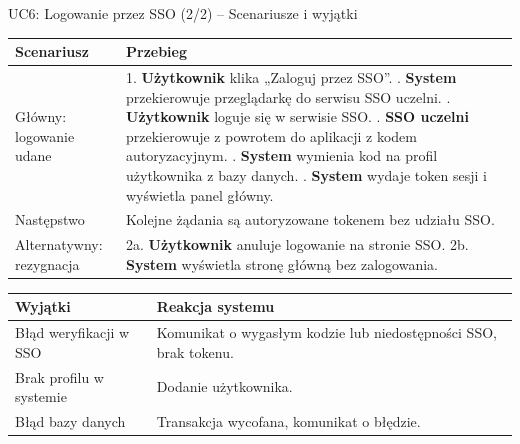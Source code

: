 \documentclass[aspectratio=169, 10pt, xcolor=table]{beamer}
\renewcommand{\arraystretch}{1.18}
\begin{document}
\begin{frame}{UC6: Logowanie przez SSO (2/2) -- Scenariusze i wyjątki}
    \scriptsize
    \renewcommand{\arraystretch}{1.10}
    \begin{tabularx}{\textwidth}{|U{3.5cm}|Y|}
        \hline
        \textcolor{NavyPrimary}{\textbf{Scenariusz}} & \textcolor{NavyPrimary}{\textbf{Przebieg}} \\
        \hline
        Główny: logowanie udane &
        1. \textbf{Użytkownik} klika „Zaloguj przez SSO”. . \textbf{System} przekierowuje przeglądarkę do serwisu SSO uczelni. . \textbf{Użytkownik} loguje się w serwisie SSO. . \textbf{SSO uczelni} przekierowuje z powrotem do aplikacji z kodem autoryzacyjnym. . \textbf{System} wymienia kod na profil użytkownika z bazy danych. . \textbf{System} wydaje token sesji i wyświetla panel główny. \\
        \hline
        Następstwo & Kolejne żądania są autoryzowane tokenem bez udziału SSO. \\
        \hline
        Alternatywny: rezygnacja &
        2a. \textbf{Użytkownik} anuluje logowanie na stronie SSO. \newline
        2b. \textbf{System} wyświetla stronę główną bez zalogowania. \\
        \hline
    \end{tabularx}

    \vspace{3pt}
    \begin{tabularx}{\textwidth}{|U{4.3cm}|Y|}
        \hline
        \textcolor{NavyPrimary}{\textbf{Wyjątki}} & \textcolor{NavyPrimary}{\textbf{Reakcja systemu}} \\
        \hline
        Błąd weryfikacji w SSO & Komunikat o wygasłym kodzie lub niedostępności SSO, brak tokenu. \\
        \hline
        Brak profilu w systemie & Dodanie użytkownika. \\
        \hline
        Błąd bazy danych & Transakcja wycofana, komunikat o błędzie. \\
        \hline
    \end{tabularx}
\end{frame}
\end{document}
